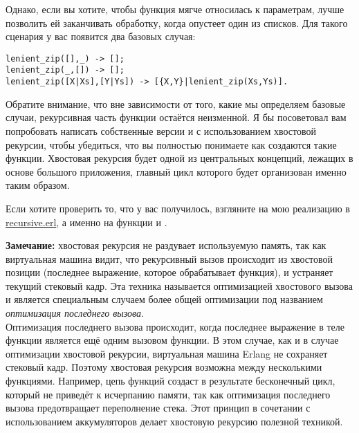 Однако, если вы хотите, чтобы функция мягче относилась к параметрам, лучше позволить ей заканчивать обработку, когда опустеет один из списков.
Для такого сценария у вас появится два базовых случая:
\begin{lstlisting}[style=erlang]
lenient_zip([],_) -> [];
lenient_zip(_,[]) -> [];
lenient_zip([X|Xs],[Y|Ys]) -> [{X,Y}|lenient_zip(Xs,Ys)].
\end{lstlisting}

Обратите внимание, что вне зависимости от того, какие мы определяем базовые случаи, рекурсивная часть функции остаётся неизменной.
Я бы посоветовал вам попробовать написать собственные версии  и  с использованием хвостовой рекурсии, чтобы убедиться, что вы полностью понимаете как создаются такие функции.
Хвостовая рекурсия будет одной из центральных концепций, лежащих в основе большого приложения, главный цикл которого будет организован именно таким образом.

Если хотите проверить то, что у вас получилось, взгляните на мою реализацию в \href{http://learnyousomeerlang.com/static/erlang/recursive.erl}{recursive.erl}, а именно на функции  и .
\colorbox{lgray}
{
    \begin{minipage}{\linewidth}
\textbf{Замечание:} хвостовая рекурсия не раздувает используемую память, так как виртуальная машина видит, что рекурсивный вызов происходит из хвостовой позиции (последнее выражение, которое обрабатывает функция), и устраняет текущий стековый кадр.
Эта техника называется оптимизацией хвостового вызова и является специальным случаем более общей оптимизации под названием \emph{оптимизация последнего вызова}.\\
Оптимизация последнего вызова происходит, когда последнее выражение в теле функции является ещё одним вызовом функции.
В этом случае, как и в случае оптимизации хвостовой рекурсии, виртуальная машина Erlang не сохраняет стековый кадр.
Поэтому хвостовая рекурсия возможна между несколькими функциями.
Например, цепь функций  создаст в результате бесконечный цикл, который не приведёт к исчерпанию памяти, так как оптимизация последнего вызова предотвращает переполнение стека.
Этот принцип в сочетании с использованием аккумуляторов делает хвостовую рекурсию полезной техникой.
    \end{minipage}
}
